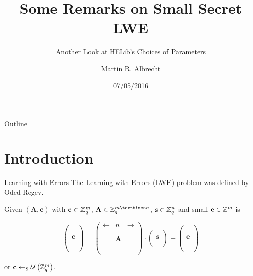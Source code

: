 \documentclass[presentation,smaller]{beamer}
\author{Martin R. Albrecht}
\date{07/05/2016}
\title{Some Remarks on Small Secret LWE}
\subtitle{Another Look at HELib’s Choices of Parameters}
\newcommand{\ZZ}[1][blank]{\ensuremath{\ifthenelse{\equal{#1}{blank}}{\mathbb{Z}}{\mathbb{Z}\left[#1\right]}\xspace}}
\newcommand{\ZZq}[1][blank]{\ensuremath{\ifthenelse{\equal{#1}{blank}}{\mathbb{Z}_q}{\mathbb{Z}_q\left[#1\right]}\xspace}}
\renewcommand{\U}[1]{\ensuremath{\mathcal{U}\left( {#1} \right)}\xspace}
\renewcommand{\vec}[1]{\ensuremath{\mathbf{#1}}\xspace}
\newcommand{\sample}{\ensuremath{\leftarrow_{\$}}}
\begin{document}
\maketitle
\begin{frame}{Outline}
\tableofcontents
\end{frame}


\section{Introduction}
\label{sec:orgheadline11}
\begin{frame}[label={sec:orgheadline1}]{Learning with Errors}
The Learning with Errors (LWE) problem was deﬁned by Oded Regev.

Given \((\vec{A},\vec{c})\) with \(\vec{c} \in \ZZq^{m}\), \(\vec{A} \in \ZZq^{m × n}\), \(\vec{s} \in \ZZq^{n}\) and small \(\vec{e} \in \ZZ^{m}\) is

\[
\left(\begin{array}{c}
\\
\\
\\ 
\vec{c} \\
\\
\\
\\
\end{array} \right) = \left(
\begin{array}{ccc}
\leftarrow & n & \rightarrow \\
\\
\\ 
& \vec{A} & \\
\\
\\
\\
\end{array} \right) \cdot \left( \begin{array}{c}
\\
\vec{s} \\
\\
\end{array} \right) + \left(
\begin{array}{c}
\\
\\
\\ 
\vec{e} \\
\\
\\
\\
\end{array} 
\right)
\]

or \(\vec{c} \sample \U{\ZZq^{m}}\).
\end{frame}
\end{document}
